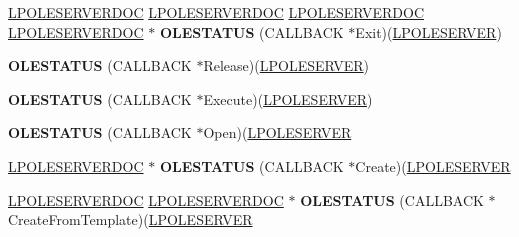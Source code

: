 \begin{DoxyCompactItemize}
\item 
\mbox{\label{struct___o_l_e_s_e_r_v_e_r_v_t_b_l_ac25097a50d16761e3758f99b7aeaf313}} 
\hyperlink{struct___o_l_e_s_e_r_v_e_r_d_o_c}{L\+P\+O\+L\+E\+S\+E\+R\+V\+E\+R\+D\+OC} \hyperlink{struct___o_l_e_s_e_r_v_e_r_d_o_c}{L\+P\+O\+L\+E\+S\+E\+R\+V\+E\+R\+D\+OC} \hyperlink{struct___o_l_e_s_e_r_v_e_r_d_o_c}{L\+P\+O\+L\+E\+S\+E\+R\+V\+E\+R\+D\+OC} \hyperlink{struct___o_l_e_s_e_r_v_e_r_d_o_c}{L\+P\+O\+L\+E\+S\+E\+R\+V\+E\+R\+D\+OC} $\ast$ {\bfseries O\+L\+E\+S\+T\+A\+T\+US} (C\+A\+L\+L\+B\+A\+CK $\ast$Exit)(\hyperlink{struct___o_l_e_s_e_r_v_e_r}{L\+P\+O\+L\+E\+S\+E\+R\+V\+ER})
\item 
\mbox{\label{struct___o_l_e_s_e_r_v_e_r_v_t_b_l_a3ad7475e702067b4e424e35ae1b14004}} 
{\bfseries O\+L\+E\+S\+T\+A\+T\+US} (C\+A\+L\+L\+B\+A\+CK $\ast$Release)(\hyperlink{struct___o_l_e_s_e_r_v_e_r}{L\+P\+O\+L\+E\+S\+E\+R\+V\+ER})
\item 
\mbox{\label{struct___o_l_e_s_e_r_v_e_r_v_t_b_l_a5d3f3641e8148eefc8710b5611d67fe7}} 
{\bfseries O\+L\+E\+S\+T\+A\+T\+US} (C\+A\+L\+L\+B\+A\+CK $\ast$Execute)(\hyperlink{struct___o_l_e_s_e_r_v_e_r}{L\+P\+O\+L\+E\+S\+E\+R\+V\+ER})
\item 
\mbox{\label{struct___o_l_e_s_e_r_v_e_r_v_t_b_l_a65193bc1876e4db5c930f3b387df60a5}} 
{\bfseries O\+L\+E\+S\+T\+A\+T\+US} (C\+A\+L\+L\+B\+A\+CK $\ast$Open)(\hyperlink{struct___o_l_e_s_e_r_v_e_r}{L\+P\+O\+L\+E\+S\+E\+R\+V\+ER}
\item 
\mbox{\label{struct___o_l_e_s_e_r_v_e_r_v_t_b_l_af33dde15399189f4ca6f25b3ac28c1dd}} 
\hyperlink{struct___o_l_e_s_e_r_v_e_r_d_o_c}{L\+P\+O\+L\+E\+S\+E\+R\+V\+E\+R\+D\+OC} $\ast$ {\bfseries O\+L\+E\+S\+T\+A\+T\+US} (C\+A\+L\+L\+B\+A\+CK $\ast$Create)(\hyperlink{struct___o_l_e_s_e_r_v_e_r}{L\+P\+O\+L\+E\+S\+E\+R\+V\+ER}
\item 
\mbox{\label{struct___o_l_e_s_e_r_v_e_r_v_t_b_l_a4b67d273b7aee420ffd13ee1e6498186}} 
\hyperlink{struct___o_l_e_s_e_r_v_e_r_d_o_c}{L\+P\+O\+L\+E\+S\+E\+R\+V\+E\+R\+D\+OC} \hyperlink{struct___o_l_e_s_e_r_v_e_r_d_o_c}{L\+P\+O\+L\+E\+S\+E\+R\+V\+E\+R\+D\+OC} $\ast$ {\bfseries O\+L\+E\+S\+T\+A\+T\+US} (C\+A\+L\+L\+B\+A\+CK $\ast$Create\+From\+Template)(\hyperlink{struct___o_l_e_s_e_r_v_e_r}{L\+P\+O\+L\+E\+S\+E\+R\+V\+ER}

\end{DoxyCompactItemize}
